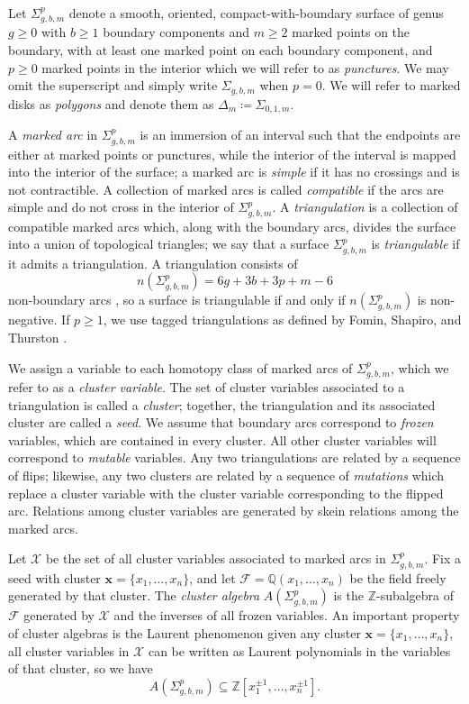 \documentclass[reqno,12pt]{amsart}
\theoremstyle{definition}
\theoremstyle{remark}
\theoremstyle{remark}
\numberwithin{equation}{section}
\begin{document}
Let $\Sigma_{g,b,m}^p$ denote a smooth, oriented, compact-with-boundary surface of genus $g\geq 0$ with $b\geq 1$ boundary components and $m\geq 2$ marked points on the boundary, with at least one marked point on each boundary component, and $p\geq 0$ marked points in the interior which we will refer to as \emph{punctures}. We may omit the superscript and simply write $\Sigma_{g,b,m}$ when $p=0$. We will refer to marked disks as \emph{polygons} and denote them as $\Delta_m \coloneqq \Sigma_{0,1,m}$.

A \emph{marked arc} in $\Sigma_{g,b,m}^p$ is an immersion of an interval such that the endpoints are either at marked points or punctures, while the interior of the interval is mapped into the interior of the surface; a marked arc is \emph{simple} if it has no crossings and is not contractible. A collection of marked arcs is called \emph{compatible} if the arcs are simple and do not cross in the interior of $\Sigma_{g,b,m}^p$. 
A \emph{triangulation} is a collection of compatible marked arcs which, along with the boundary arcs, divides the surface into a union of topological triangles; we say that a surface $\Sigma_{g,b,m}^p$ is \emph{triangulable} if it admits a triangulation. A triangulation consists of \[ n(\Sigma_{g,b,m}^p) = 6g + 3b + 3p + m - 6 \] non-boundary arcs \cite[Proposition 2.10]{FST08}, so a surface is triangulable if and only if $n(\Sigma_{g,b,m}^p)$ is non-negative. If $p\geq 1$, we use tagged triangulations as defined by Fomin, Shapiro, and Thurston \cite{FST08}. 

We assign a variable to each homotopy class of marked arcs of $\Sigma_{g,b,m}^p$, which we refer to as a \emph{cluster variable}. The set of cluster variables associated to a triangulation is called a \emph{cluster}; together, the triangulation and its associated cluster are called a \emph{seed}. We assume that boundary arcs correspond to \emph{frozen} variables, which are contained in every cluster. All other cluster variables will correspond to \emph{mutable} variables. Any two triangulations are related by a sequence of flips; likewise, any two clusters are related by a sequence of \emph{mutations} which replace a cluster variable with the cluster variable corresponding to the flipped arc. Relations among cluster variables are generated by skein relations among the marked arcs. 

Let $\mathcal{X}$ be the set of all cluster variables associated to marked arcs in $\Sigma_{g,b,m}^p$. Fix a seed with cluster $ \mathbf{x} = \{x_1, \dotsc, x_n\}$, and let $\mathcal{F} = \mathbb{Q}(x_1, \dotsc, x_n)$ be the field freely generated by that cluster. The \emph{cluster algebra} $A(\Sigma_{g,b,m}^p)$ is the $\mathbb{Z}$-subalgebra of $\mathcal{F}$ generated by $\mathcal{X}$ and the inverses of all frozen variables. An important property of cluster algebras is the Laurent phenomenon \textemdash given any cluster $ \mathbf{x} = \{x_1, \dotsc, x_n\}$, all cluster variables in $\mathcal{X}$ can be written as Laurent polynomials in the variables of that cluster, so we have \[ A(\Sigma_{g,b,m}^p) \subseteq \mathbb{Z}[x_1^{\pm 1}, \dotsc, x_n^{\pm 1}]. \] 
\end{document}
